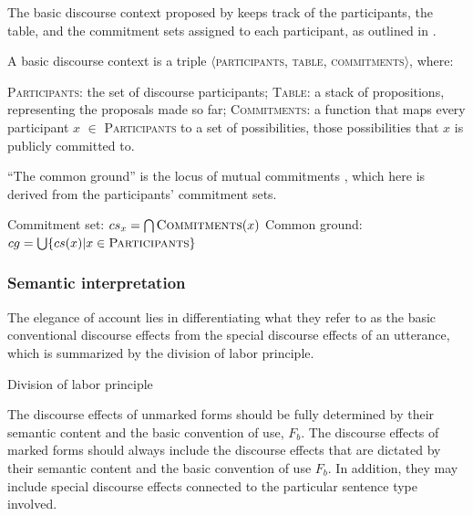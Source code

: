 \documentclass[output=paper,colorlinks,citecolor=brown            ,chinesefont]{langscibook}
\begin{document}
The basic discourse context proposed by \citeauthor{Farkas+2017} keeps track of the participants, the table, and the commitment sets assigned to each participant, as outlined in .

\begin{exe}
\ex\label{context} A basic discourse context is a triple $\langle$\textsc{participants, table, commitments}$\rangle$, where:
\begin{xlist}
\ex\textsc{Participants}: the set of discourse participants;
\ex\textsc{Table}: a stack of propositions, representing the proposals made so far;
\ex\textsc{Commitments}: a function that maps every participant $x$ $\in$ \textsc{Participants} to a set of possibilities, those possibilities that $x$ is publicly committed to. 
\end{xlist}
\end{exe}

``The common ground'' is the locus of mutual commitments \citep{Stalnaker1978, Farkas+2010}, which here is derived from the participants' commitment sets. %

\begin{exe}
\ex\label{def}
\begin{xlist}
\ex\label{def1} Commitment set: $cs_x = \bigcap\textsc{Commitments}(x)$
\ex\label{def2} Common ground: $cg = \bigcup\{cs(x) | x\in \textsc{Participants}\} $\\
\end{xlist}
\end{exe}

\subsubsection{Semantic interpretation} 
\label{subsubsec:interpretation}

The elegance of  account lies in differentiating what they refer to as the basic conventional discourse effects from the special discourse effects of an utterance, which is summarized by the division of labor principle.

\begin{exe}
\ex\label{Labor} Division of labor principle
\begin{xlist}
\ex\label{Labor1} The discourse effects of unmarked forms should be fully determined by their semantic content and the basic convention of use, $F_b$.
\ex\label{Labor2} The discourse effects of marked forms should always include the discourse effects that are dictated by their semantic content and the basic convention of use $F_b$. In addition, they may include special discourse effects connected to the particular sentence type involved. \\ \hfill \citep[250]{Farkas+2017}
\end{xlist}
\end{exe}
\end{document}
